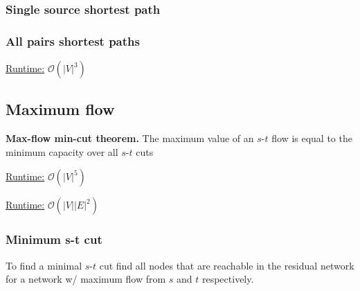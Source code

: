 \subsubsection{Single source shortest path}


\subsubsection{All pairs shortest paths}
\underline{Runtime:} $\mathcal{O}(\lvert V \rvert^3)$

\subsection{Maximum flow}

\textbf{Max-flow min-cut theorem.} The maximum value of an $s$-$t$ flow is
equal to the minimum capacity over all $s$-$t$ cuts

\underline{Runtime:} $\mathcal{O}(\lvert V \rvert^5)$

\underline{Runtime:} $\mathcal{O}(\lvert V \rvert \lvert E \rvert^2)$

\subsubsection{Minimum s-t cut}

To find a minimal $s$-$t$ cut find all nodes that are reachable in the
residual network for a network w/ maximum flow from $s$ and $t$
respectively.


